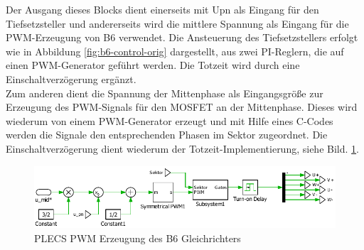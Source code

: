 			Der Ausgang dieses Blocks dient einerseits mit \gls{Upn} als Eingang für den Tiefsetzsteller und andererseits wird die mittlere Spannung als Eingang für die PWM-Erzeugung von B6 verwendet. Die Ansteuerung des Tiefsetzstellers erfolgt wie in Abbildung \ref{fig:b6-control-orig} dargestellt, aus zwei PI-Reglern, die auf einen PWM-Generator geführt werden. Die Totzeit wird durch eine Einschaltverzögerung ergänzt.\\
			Zum anderen dient die Spannung der Mittenphase als Eingangsgröße zur Erzeugung des PWM-Signals für den \gls{MOSFET} an der Mittenphase. Dieses wird wiederum von einem PWM-Generator erzeugt und mit Hilfe eines C-Codes werden die Signale den entsprechenden Phasen im Sektor zugeordnet. Die Einschaltverzögerung dient wiederum der Totzeit-Implementierung, siehe Bild. \ref{fig:plecsb6controlpwmmid}.
			
		\begin{figure}
			\centering
			\includegraphics[width=0.9\linewidth]{content/Grafiken/PLECS_B6_ControlPWMmid}
			\caption{PLECS PWM Erzeugung des B6 Gleichrichters}
			\label{fig:plecsb6controlpwmmid}
		\end{figure}
		
		
			
			
